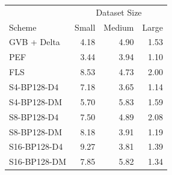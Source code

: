\begin{tabular}{lrrr}
\toprule
 & \multicolumn{3}{c}{Dataset Size} \\
Scheme & Small & Medium & Large \\
\midrule
GVB + Delta & 4.18 & 4.90 & 1.53 \\
PEF & 3.44 & 3.94 & 1.10 \\
FLS & 8.53 & 4.73 & 2.00 \\
S4-BP128-D4 & 7.18 & 3.65 & 1.14 \\
S4-BP128-DM & 5.70 & 5.83 & 1.59 \\
S8-BP128-D4 & 7.50 & 4.89 & 2.08 \\
S8-BP128-DM & 8.18 & 3.91 & 1.19 \\
S16-BP128-D4 & 9.27 & 3.81 & 1.39 \\
S16-BP128-DM & 7.85 & 5.82 & 1.34 \\
\bottomrule
\end{tabular}
